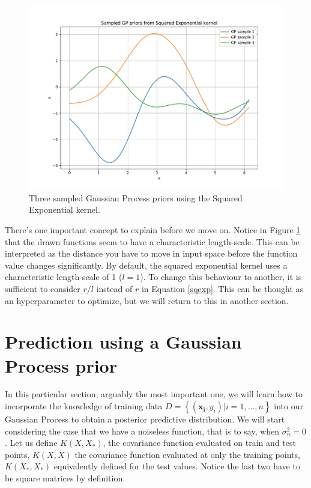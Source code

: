 \documentclass[10pt,a4paper,twoside]{book}
\begin{document}
\begin{figure}
\caption{Three sampled Gaussian Process priors using the Squared Exponential kernel.}
\label{fig:drawPrior}
\includegraphics[width=\textwidth]{figures/chapter2/drawPrior}
\end{figure}

There's one important concept to explain before we move on. Notice in Figure \ref{fig:drawPrior} that the drawn functions seem to have a characteristic length-scale. This can be interpreted as the distance you have to move in input space before the function value changes significantly. By default, the squared exponential kernel uses a characteristic length-scale of 1 ($l = 1$). To change this behaviour to another, it is sufficient to consider $r/l$ instead of $r$ in Equation \ref{sqexp}. This can be thought as an hyperparameter to optimize, but we will return to this in another section.

\section{Prediction using a Gaussian Process prior}
\label{pred}

In this particular section, arguably the most important one, we will learn how to incorporate the knowledge of training data $D = \left\lbrace \left(\boldsymbol{x_i}, y_i\right) | i = 1,\dots,n\right\rbrace$ into our Gaussian Process to obtain a posterior predictive distribution. We will start considering the case that we have a noiseless function, that is to say, when $\sigma^2_n = 0$. Let us define $K(X, X_{*})$, the covariance function evaluated on train and test points, $K(X, X)$ the covariance function evaluated at only the training points, $K(X_{*}, X_{*})$ equivalently defined for the test values. Notice the last two have to be square matrices by definition.\\
\end{document}
